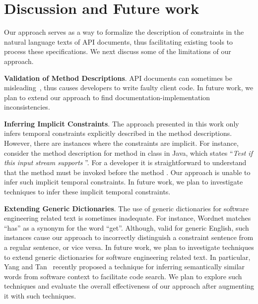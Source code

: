 \section{Discussion and Future work}
\label{sec:discussion}

Our approach serves as a way to formalize the description of constraints in the natural language texts of API documents, thus facilitating existing tools to process these specifications. We next discuss some of the limitations of our approach.

\textbf{Validation of Method Descriptions}. API documents can sometimes be misleading~\cite{tcomment,Cindy10:PASTE}, thus causes developers to write faulty client code. In future work, we plan to extend our approach to find documentation-implementation inconsistencies.

\textbf{Inferring Implicit Constraints}. The approach presented in this work only infers temporal constraints explicitly described in the method descriptions.
However, there are instances where the constraints are implicit. For instance, consider the method description for  method in  class in Java, which states ``\textit{Test if this input stream supports }''. For a developer it is straightforward to understand that the method  must be invoked before the method . Our approach is unable to infer such implicit temporal constraints. In future work, we plan to investigate techniques to infer these implicit temporal constraints.

\textbf{Extending Generic Dictionaries}. The use of generic dictionaries for software engineering related text is sometimes inadequate. For instance, Wordnet matches ``has'' as a synonym for the word ``get''. Although, valid for generic English, such instances cause our approach to incorrectly distinguish a constraint sentence from a regular sentence, or vice versa. In future work, we plan to investigate techniques to extend generic dictionaries for software engineering related text. In particular, Yang and Tan~\cite{swordnet} recently proposed a technique for inferring semantically similar words from software context to facilitate code search. We plan to explore such techniques and evaluate the overall effectiveness of our approach after augmenting it with such techniques.  

